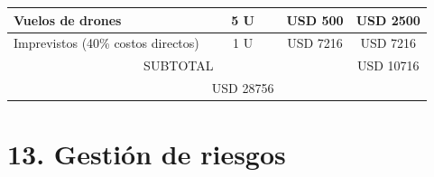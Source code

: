 \documentclass[
11pt, %
]{charter}
\begin{document}
\begin{table}[htpb]
\begin{tabularx}{\linewidth}{@{}|X|c|r|r|@{}}
    Vuelos de drones                                         &
    \multicolumn{1}{c|}{5 U}                                   &
    \multicolumn{1}{c|}{USD 500}                                 &
    \multicolumn{1}{c|}{USD 2500}                                   \\ \hline

    Imprevistos (40\% costos directos)                          &
    \multicolumn{1}{c|}{1 U}                                    &
    \multicolumn{1}{c|}{USD 7216}                               &
    \multicolumn{1}{c|}{USD 7216}                                   \\ \hline

    \multicolumn{3}{|c|}{SUBTOTAL}                              &
    \multicolumn{1}{c|}{USD 10716}                                   \\ \hline
    \rowcolor[HTML]{C0C0C0}
    \multicolumn{3}{|c|}{TOTAL}                                 &

    USD 28756                                                       \\ \hline
  \end{tabularx}%
\end{table}


\section{13. Gestión de riesgos}
\label{sec:riesgos}
\end{document}
